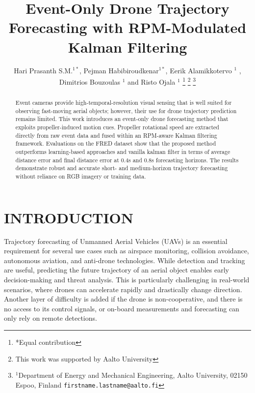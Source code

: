 \documentclass[letterpaper, 10 pt, conference]{ieeeconf}  %
\title{\LARGE \bf
Event-Only Drone Trajectory Forecasting with RPM-Modulated Kalman Filtering
}
\author{Hari Prasanth S.M.$^{1*}$, Pejman Habibiroudkenar$^{1*}$, Eerik Alamikkotervo $^{1}$ , Dimitrios Bouzoulas $^{1}$ and Risto Ojala  $^{1}$ %
\thanks{*Equal contribution}%
\thanks{This work was supported by Aalto University}%
\thanks{$^{1}$Department of Energy and Mechanical Engineering,
        Aalto University, 02150 Espoo, Finland
        {\tt\small firstname.lastname@aalto.fi}}%
}
\begin{document}
\maketitle
\thispagestyle{empty}
\pagestyle{empty}


\begin{abstract}

Event cameras provide high-temporal-resolution visual sensing that is well suited for observing fast-moving aerial objects; however, their use for drone trajectory prediction remains limited. This work introduces an event-only drone forecasting method that exploits propeller-induced motion cues. Propeller rotational speed are extracted directly from raw event data and fused within an RPM-aware Kalman filtering framework. Evaluations on the FRED dataset show that the proposed method outperforms learning-based approaches and vanilla kalman filter in terms of average distance error and final distance error at 0.4s and 0.8s forecasting horizons. The results demonstrate robust and accurate short- and medium-horizon trajectory forecasting without reliance on RGB imagery or training data.

\end{abstract}


\section{INTRODUCTION} \label{sec:introduction}

Trajectory forecasting of Unmanned Aerial Vehicles (UAVs) is an essential requirement for several use cases such as airspace monitoring, collision avoidance, autonomous aviation, and anti-drone technologies. While detection and tracking are useful, predicting the future trajectory of an aerial object enables early decision-making and threat analysis.
This is particularly challenging in real-world scenarios, where drones can accelerate rapidly and drastically change direction. Another layer of difficulty is added if the drone is non-cooperative, and there is no access to its control signals, or on-board measurements and forecasting can only rely on remote detections. 
\end{document}
